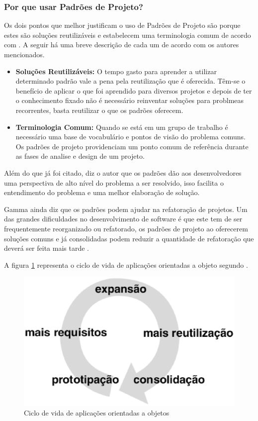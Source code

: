 \subsubsection{Por que usar Padrões de Projeto?}

Os dois pontos que melhor justificam o uso de Padrões de Projeto são porque estes são soluções reutilizáveis e estabelecem uma terminologia comum de acordo com \cite{Shalloway:Trott:2004}. A seguir há uma breve descrição de cada um de acordo com os autores mencionados.

\begin{itemize}
	\item \textbf{Soluções Reutilizáveis:} O tempo gasto para aprender a utilizar determinado padrão vale a pena pela reutilização que é oferecida. Têm-se o benefício de aplicar o que foi aprendido para diversos projetos e depois de ter o conhecimento fixado não é necessário reinventar soluções para problmeas recorrentes, basta reutilizar o que os padrões oferecem.
	\item \textbf{Terminologia Comum:} Quando se está em um grupo de trabalho é necessário uma base de vocabulário e pontos de visão do problema comuns. Os padrões de projeto providenciam um ponto comum de referência durante as fases de analise e design de um projeto.
\end{itemize}

Além do que já foi citado, diz o autor que os padrões dão aos desenvolvedores uma perspectiva de alto nível do problema a ser resolvido, isso facilita o entendimento do problema e uma melhor elaboração de solução.

Gamma ainda diz que os padrões podem ajudar na refatoração de projetos. Um das grandes dificuldades no desenvolvimento de software é que este tem de ser frequentemente reorganizado ou refatorado, os padrões de projeto ao oferecerem soluções comuns e já consolidadas podem reduzir a quantidade de refatoração que deverá ser feita mais tarde \cite{Gamma:Helm:Johnson:Vlissides:1995}.

A figura \ref{ciclo de vida oo} representa o ciclo de vida de aplicações orientadas a objeto segundo \cite{Gamma:Helm:Johnson:Vlissides:1995}.

\begin{figure}[!h]
	\centering
	\includegraphics[scale=0.5]{figuras/capitulo2/ciclo_de_vida_oo.eps}
	\caption{Ciclo de vida de aplicações orientadas a objetos}
	\label{ciclo de vida oo}
\end{figure}

